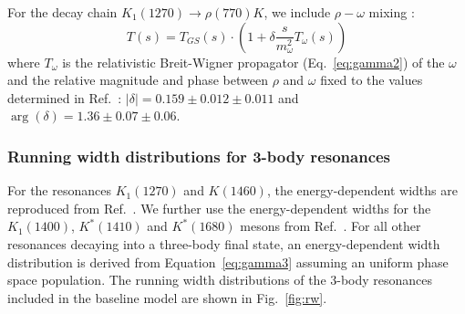 	For the decay chain $K_1(1270) \to \rho(770) K$, we include $\rho-\omega$ mixing \cite{Akhmetshin:2001ig}:
	\begin{equation}
	T(s) = T_{GS}(s) \cdot \left( 1 + \delta \frac{s}{m_\omega^2} T_\omega(s) \right)
	\end{equation}
	where $T_\omega$ is the relativistic Breit-Wigner propagator (Eq.~\ref{eq:gamma2}) of the $\omega$ and the relative magnitude and phase between $\rho$ and $\omega$ fixed 
	to the values determined in Ref.~\cite{Schubiger,Aaij:2648586}:
	$\vert \delta \vert = 0.159 \pm 0.012 \pm 0.011$ and $\arg(\delta) = 1.36 \pm 0.07 \pm 0.06$.

\subsubsection*{Running width distributions for 3-body resonances}

For the resonances $K_1(1270)$ and $K(1460)$, the energy-dependent widths 
are reproduced from Ref.~\cite{Aaij:2017kbo}.
We further use the energy-dependent widths for the $K_1(1400)$, $K^*(1410)$ and $K^*(1680)$ mesons from Ref.~\cite{dArgent:2017gzv}. 	
For all other resonances decaying into a three-body final state, an energy-dependent width distribution is derived from Equation~\ref{eq:gamma3} assuming an uniform phase space population. 
The running width distributions of the 3-body resonances included in the baseline model are shown in Fig.~\ref{fig:rw}.


